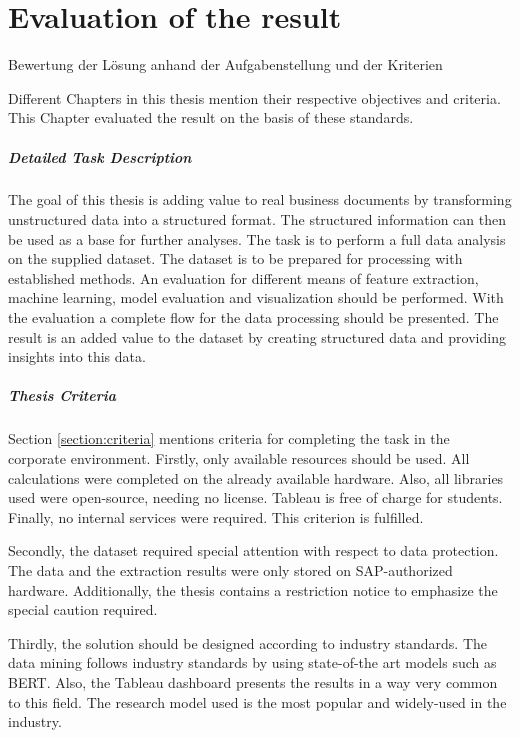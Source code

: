 \chapter{Evaluation of the result}
Bewertung der Lösung anhand der Aufgabenstellung und der Kriterien

Different Chapters in this thesis mention their respective objectives and criteria. This Chapter evaluated the result on the basis of these standards.

\paragraph{Detailed Task Description}
The goal of this thesis is adding value to real business documents by transforming unstructured data into a structured format. The structured information can then be used as a base for further analyses.
The task is to perform a full data analysis on the supplied dataset. The dataset is to be prepared for processing with established methods. An evaluation for different means of feature extraction, machine learning, model evaluation and visualization should be performed. With the evaluation a complete flow for the data processing should be presented. The result is an added value to the dataset by creating structured data and providing insights into this data.


\paragraph{Thesis Criteria}
Section \ref{section:criteria} mentions criteria for completing the task in the corporate environment. Firstly, only available resources should be used. All calculations were completed on the already available hardware. Also, all libraries used were open-source, needing no license. Tableau is free of charge for students. Finally, no internal services were required. This criterion is fulfilled.

Secondly, the dataset required special attention with respect to data protection. The data and the extraction results were only stored on SAP-authorized hardware. Additionally, the thesis contains a restriction notice to emphasize the special caution required.

Thirdly, the solution should be designed according to industry standards. The data mining follows industry standards by using state-of-the art models such as \ac{BERT}. Also, the Tableau dashboard presents the results in a way very common to this field. The research model used is the most popular and widely-used in the industry.

